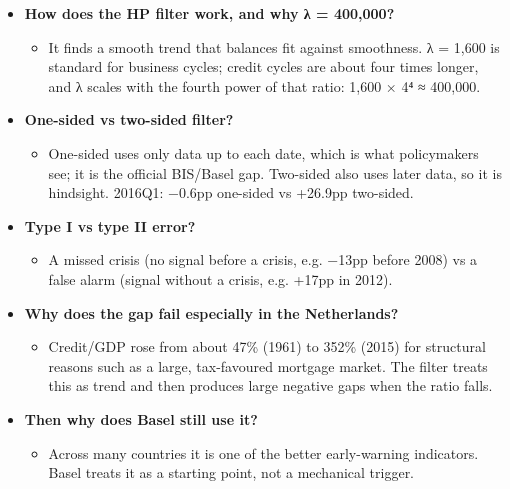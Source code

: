 \documentclass[10pt]{article}
\begin{document}
\begin{tcolorbox}[sbox,width=0.495\linewidth,height=14.6cm,nobeforeafter,box align=top,fit basedim=11pt,colframe=nlred!70,colbacktitle=nlred!8,coltitle=nlred,title=LIKELY CHALLENGES · definitions and logic]
\begin{itemize}
\item[\textcolor{navy}{\textbf{Q}}] \textbf{How does the HP filter work, and why λ = 400,000?}
\begin{itemize}
\item It finds a smooth trend that balances fit against smoothness. λ = 1,600 is standard for business cycles; credit cycles are about four times longer, and λ scales with the fourth power of that ratio: 1,600 × 4⁴ ≈ 400,000.
\end{itemize}
\item[\textcolor{navy}{\textbf{Q}}] \textbf{One-sided vs two-sided filter?}
\begin{itemize}
\item One-sided uses only data up to each date, which is what policymakers see; it is the official BIS/Basel gap. Two-sided also uses later data, so it is hindsight. 2016Q1: −0.6pp one-sided vs +26.9pp two-sided.
\end{itemize}
\item[\textcolor{navy}{\textbf{Q}}] \textbf{Type I vs type II error?}
\begin{itemize}
\item A missed crisis (no signal before a crisis, e.g. −13pp before 2008) vs a false alarm (signal without a crisis, e.g. +17pp in 2012).
\end{itemize}
\item[\textcolor{navy}{\textbf{Q}}] \textbf{Why does the gap fail especially in the Netherlands?}
\begin{itemize}
\item Credit/GDP rose from about 47\% (1961) to 352\% (2015) for structural reasons such as a large, tax-favoured mortgage market. The filter treats this as trend and then produces large negative gaps when the ratio falls.
\end{itemize}
\item[\textcolor{navy}{\textbf{Q}}] \textbf{Then why does Basel still use it?}
\begin{itemize}
\item Across many countries it is one of the better early-warning indicators. Basel treats it as a starting point, not a mechanical trigger.
\end{itemize}
\end{itemize}
\end{tcolorbox}
\newpage
\end{document}
